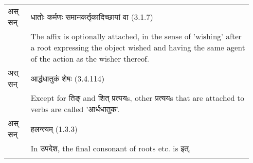 		\begin{longtable}{ |p{1.4cm}|p{14.6cm}| } 
			\hline
			\rowcolor{blue!10}
			\texthindi{अस् सन्}
			&\texthindi{धातोः कर्मणः समानकर्तृकादिच्छायां वा} (3.1.7)\\
			\rowcolor{blue!10}
			&The affix is optionally attached, in the sense of 'wishing' after a root expressing the object wished and having the same agent of the action as the wisher thereof. 
			\\\hline
			
			\rowcolor{blue!10}
			\texthindi{अस् सन्}
			&\texthindi{आर्द्धधातुकं शेषः}  (3.4.114)\\
			\rowcolor{blue!10}
			&Except for \texthindi{तिङ्} and \texthindi{शित् प्रत्यय}s, other \texthindi{प्रत्यय}s that are attached to verbs are called '\texthindi{आर्धधातुक}'. 
			\\\hline
			\rowcolor{red!10}
			\texthindi{अस् सन्}
			&\texthindi{हलन्त्यम्} (1.3.3)\\
			\rowcolor{red!10}
			&In \texthindi{उपदेश}, the final consonant of roots etc. is \texthindi{इत्}.
			\\\hline
			\rowcolor{red!10}
			

\end{longtable}
